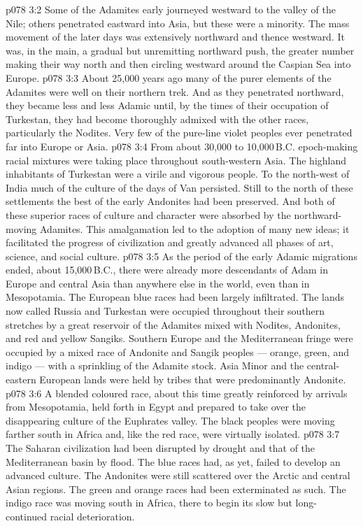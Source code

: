 \vs p078 3:2 Some of the Adamites early journeyed westward to the valley of the Nile; others penetrated eastward into Asia, but these were a minority. The mass movement of the later days was extensively northward and thence westward. It was, in the main, a gradual but unremitting northward push, the greater number making their way north and then circling westward around the Caspian Sea into Europe.
\vs p078 3:3 About 25,000 years ago many of the purer elements of the Adamites were well on their northern trek. And as they penetrated northward, they became less and less Adamic until, by the times of their occupation of Turkestan, they had become thoroughly admixed with the other races, particularly the Nodites. Very few of the pure\hyp{}line violet peoples ever penetrated far into Europe or Asia.
\vs p078 3:4 From about 30,000 to 10,000\,B.C. epoch\hyp{}making racial mixtures were taking place throughout south\hyp{}western Asia. The highland inhabitants of Turkestan were a virile and vigorous people. To the north\hyp{}west of India much of the culture of the days of Van persisted. Still to the north of these settlements the best of the early Andonites had been preserved. And both of these superior races of culture and character were absorbed by the northward\hyp{}moving Adamites. This amalgamation led to the adoption of many new ideas; it facilitated the progress of civilization and greatly advanced all phases of art, science, and social culture.
\vs p078 3:5 \pc As the period of the early Adamic migrations ended, about 15,000\,B.C., there were already more descendants of Adam in Europe and central Asia than anywhere else in the world, even than in Mesopotamia. The European blue races had been largely infiltrated. The lands now called Russia and Turkestan were occupied throughout their southern stretches by a great reservoir of the Adamites mixed with Nodites, Andonites, and red and yellow Sangiks. Southern Europe and the Mediterranean fringe were occupied by a mixed race of Andonite and Sangik peoples --- orange, green, and indigo --- with a sprinkling of the Adamite stock. Asia Minor and the central\hyp{}eastern European lands were held by tribes that were predominantly Andonite.
\vs p078 3:6 A blended coloured race, about this time greatly reinforced by arrivals from Mesopotamia, held forth in Egypt and prepared to take over the disappearing culture of the Euphrates valley. The black peoples were moving farther south in Africa and, like the red race, were virtually isolated.
\vs p078 3:7 The Saharan civilization had been disrupted by drought and that of the Mediterranean basin by flood. The blue races had, as yet, failed to develop an advanced culture. The Andonites were still scattered over the Arctic and central Asian regions. The green and orange races had been exterminated as such. The indigo race was moving south in Africa, there to begin its slow but long\hyp{}continued racial deterioration.
